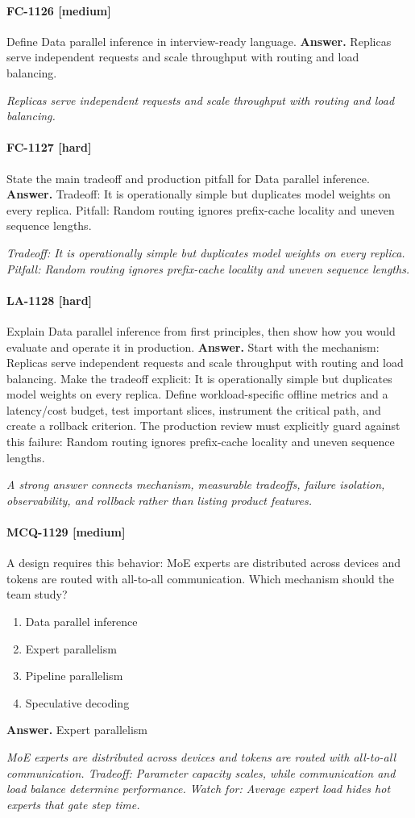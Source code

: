 \paragraph{FC-1126 [medium]} Define Data parallel inference in interview-ready language.
\noindent\textbf{Answer.} Replicas serve independent requests and scale throughput with routing and load balancing.
\par\textit{Replicas serve independent requests and scale throughput with routing and load balancing.}
\paragraph{FC-1127 [hard]} State the main tradeoff and production pitfall for Data parallel inference.
\noindent\textbf{Answer.} Tradeoff: It is operationally simple but duplicates model weights on every replica. Pitfall: Random routing ignores prefix-cache locality and uneven sequence lengths.
\par\textit{Tradeoff: It is operationally simple but duplicates model weights on every replica. Pitfall: Random routing ignores prefix-cache locality and uneven sequence lengths.}
\paragraph{LA-1128 [hard]} Explain Data parallel inference from first principles, then show how you would evaluate and operate it in production.
\noindent\textbf{Answer.} Start with the mechanism: Replicas serve independent requests and scale throughput with routing and load balancing. Make the tradeoff explicit: It is operationally simple but duplicates model weights on every replica. Define workload-specific offline metrics and a latency/cost budget, test important slices, instrument the critical path, and create a rollback criterion. The production review must explicitly guard against this failure: Random routing ignores prefix-cache locality and uneven sequence lengths.
\par\textit{A strong answer connects mechanism, measurable tradeoffs, failure isolation, observability, and rollback rather than listing product features.}
\paragraph{MCQ-1129 [medium]} A design requires this behavior: MoE experts are distributed across devices and tokens are routed with all-to-all communication. Which mechanism should the team study?
\begin{enumerate}[label=\Alph*.]
\item Data parallel inference
\item Expert parallelism
\item Pipeline parallelism
\item Speculative decoding
\end{enumerate}
\noindent\textbf{Answer.} Expert parallelism
\par\textit{MoE experts are distributed across devices and tokens are routed with all-to-all communication. Tradeoff: Parameter capacity scales, while communication and load balance determine performance. Watch for: Average expert load hides hot experts that gate step time.}
